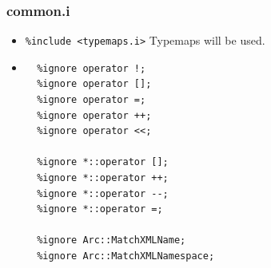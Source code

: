 \documentclass{article}
\begin{document}
\subsubsection{common.i}
\label{icommon}
\begin{flushleft}
\begin{itemize}
  \item{ \verb$%include <typemaps.i>$} \linebreak
  Typemaps will be used. 
\end{itemize}
\begin{itemize}
  \item{\begin{verbatim}
  %ignore operator !;
  %ignore operator [];
  %ignore operator =;
  %ignore operator ++;
  %ignore operator <<;

  %ignore *::operator [];
  %ignore *::operator ++;
  %ignore *::operator --;
  %ignore *::operator =;

  %ignore Arc::MatchXMLName;
  %ignore Arc::MatchXMLNamespace;


\end{verbatim}}
\end{itemize}
\end{flushleft}
\end{document}
